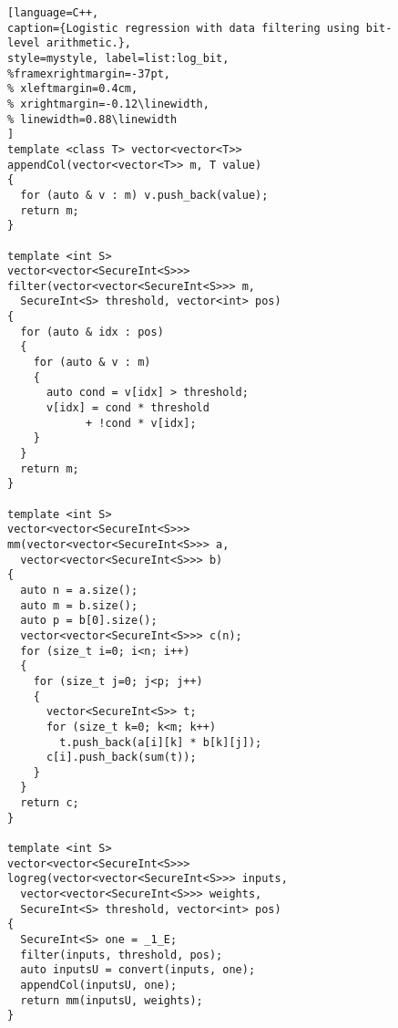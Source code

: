 \begin{figure}[t]
\begin{minipage}{\linewidth}
\begin{lstlisting}[language=C++,
caption={Logistic regression with data filtering using bit-level arithmetic.},
style=mystyle, label=list:log_bit,
%framexrightmargin=-37pt,
% xleftmargin=0.4cm,
% xrightmargin=-0.12\linewidth,
% linewidth=0.88\linewidth
]
template <class T> vector<vector<T>>
appendCol(vector<vector<T>> m, T value)
{
  for (auto & v : m) v.push_back(value);
  return m;
}

template <int S>
vector<vector<SecureInt<S>>>
filter(vector<vector<SecureInt<S>>> m,
  SecureInt<S> threshold, vector<int> pos)
{
  for (auto & idx : pos)
  {
    for (auto & v : m)
    {
      auto cond = v[idx] > threshold;
      v[idx] = cond * threshold
            + !cond * v[idx];
    }
  }
  return m;
}

template <int S>
vector<vector<SecureInt<S>>>
mm(vector<vector<SecureInt<S>>> a,
  vector<vector<SecureInt<S>>> b)
{
  auto n = a.size();
  auto m = b.size();
  auto p = b[0].size();
  vector<vector<SecureInt<S>>> c(n);
  for (size_t i=0; i<n; i++)
  {
    for (size_t j=0; j<p; j++)
    {
      vector<SecureInt<S>> t;
      for (size_t k=0; k<m; k++)
        t.push_back(a[i][k] * b[k][j]);
      c[i].push_back(sum(t));
    }
  }
  return c;
}

template <int S>
vector<vector<SecureInt<S>>>
logreg(vector<vector<SecureInt<S>>> inputs,
  vector<vector<SecureInt<S>>> weights,
  SecureInt<S> threshold, vector<int> pos)
{
  SecureInt<S> one = _1_E;
  filter(inputs, threshold, pos);
  auto inputsU = convert(inputs, one);
  appendCol(inputsU, one);
  return mm(inputsU, weights);
}
\end{lstlisting}
\end{minipage}
\end{figure}
